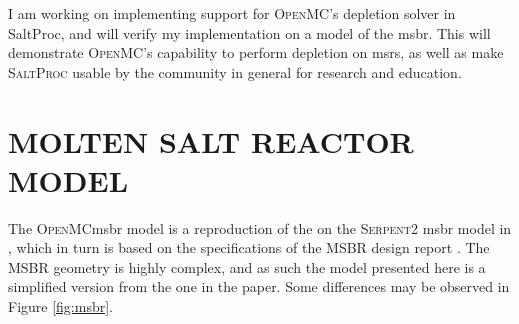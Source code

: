 \documentclass[letterpaper]{mc2023}
\newcommand{\Cyclus}{\textsc{Cyclus}\xspace}
\newcommand{\SaltProc}{\textsc{SaltProc}\xspace}
\newcommand{\OpenMC}{\textsc{OpenMC}\xspace}
\newcommand{\SerpentTWO}{\textsc{Serpent2}\xspace}
\newcommand{\ONIX}{\textsc{ONIX}\xspace}
\newcommand{\NJOYTWOONE}{\textsc{NJOY21}\xspace}
\begin{document}

I am working on implementing support for \OpenMC's depletion solver in SaltProc,
and will verify my implementation on a model of the \Gls{msbr}. This will 
demonstrate \OpenMC's capability to perform depletion on \Gls{msr}s, as well
as make \SaltProc usable by the community in general for research and
education.

\section{MOLTEN SALT REACTOR MODEL}
\label{sec:msr-model}

The \OpenMC \Gls{msbr} model is a reproduction of the on the \SerpentTWO
\Gls{msbr} model in \cite{rykhlevskii_modeling_2019}, which in turn is based on
the specifications of the MSBR design report \cite{robertson_conceptual_1971}.
The MSBR geometry is highly complex, and as such the model presented here
is a simplified version from the one in the paper. Some differences may be
observed in Figure \ref{fig:msbr}.
\end{document}
